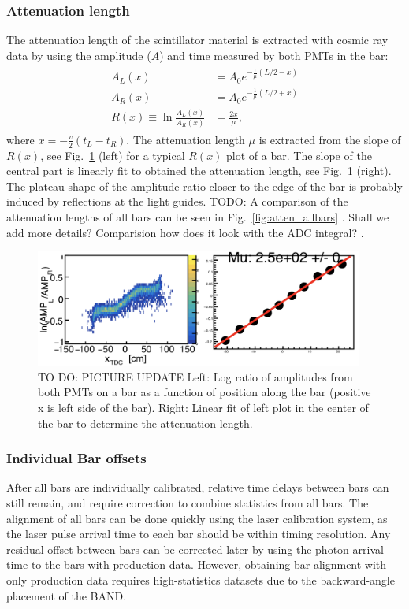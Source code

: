 \documentclass[3p,final,twocolumn]{elsarticle}
\begin{document}
\subsubsection{Attenuation length}
The attenuation length of the scintillator material is extracted with cosmic ray data by using the 
amplitude ($A$) and time measured by both PMTs in the bar:
\begin{eqnarray}
	\begin{split}
		A_L(x) &= A_0 e^{-\frac{1}{\mu}\left(L/2-x\right) }				\\
		A_R(x) &= A_0 e^{-\frac{1}{\mu}\left(L/2+x\right) }				\\
		R(x) \equiv \ln{\frac{A_L(x)}{A_R(x)}} &= \frac{2x}{\mu},					
		 \label{eqn:atten}
	\end{split}
\end{eqnarray}
where $x=-\frac{v}{2}(t_L - t_R)$. The attenuation length $\mu$ is extracted from the slope of $R(x)$, see Fig.~\ref{fig:atten} (left) for a typical $R(x)$ plot of a bar.
The slope of the central part is linearly fit to obtained the attenuation length, see Fig.~\ref{fig:atten} (right). 
The plateau shape of the amplitude ratio closer to the edge of the bar is probably induced by reflections at the light guides.   
 {\color{red} TODO: A comparison of the attenuation lengths of all bars can be seen in Fig.~\ref{fig:atten_allbars} }.
 {\color{red} Shall we add more details?  Comparision how does it look with the ADC integral? }.
\begin{figure}[h!]
	\centering
		\includegraphics[width=0.96\textwidth]{atten.png}
	\caption{TO DO: PICTURE UPDATE Left: Log ratio of amplitudes from both PMTs on a bar as a function of position along the bar (positive x is left side of the bar). Right: Linear fit of left plot in the center of the bar to determine the attenuation length.}
	\label{fig:atten}
\end{figure}

\subsubsection{Individual Bar offsets}
After all bars are individually calibrated, relative time delays between bars can still remain, and require correction to combine 
statistics from all bars. The alignment of all bars can be done quickly using the laser calibration system, as the laser pulse arrival 
time to each bar should be within timing resolution. Any residual offset 
between bars can be corrected later by using the photon arrival time to the bars with production data. 
However, obtaining bar alignment with only production data 
requires high-statistics datasets due to the backward-angle placement of the BAND. 
\end{document}
